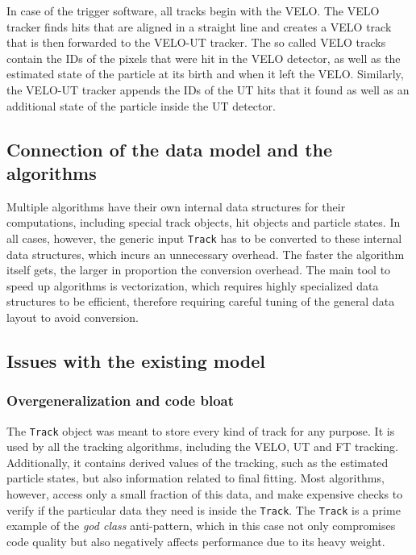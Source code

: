 \documentclass[12pt]{article}
\newcommand{\code}[1]{\texttt{#1}}
\begin{document}
In case of the trigger software, all tracks begin with the VELO. The VELO tracker finds hits that are aligned in a straight line and creates a VELO track that is then forwarded to the VELO-UT tracker. The so called VELO tracks contain the IDs of the pixels that were hit in the VELO detector, as well as the estimated state of the particle at its birth and when it left the VELO. Similarly, the VELO-UT tracker appends the IDs of the UT hits that it found as well as an additional state of the particle inside the UT detector.


\subsection{Connection of the data model and the algorithms}

Multiple algorithms have their own internal data structures for their computations, including special track objects, hit objects and particle states. In all cases, however, the generic input \code{Track} has to be converted to these internal data structures, which incurs an unnecessary overhead. The faster the algorithm itself gets, the larger in proportion the conversion overhead. The main tool to speed up algorithms is vectorization, which requires highly specialized data structures to be efficient, therefore requiring careful tuning of the general data layout to avoid conversion.

\subsection{Issues with the existing model}\label{sec_datamodel_issues}

\subsubsection{Overgeneralization and code bloat}

The \code{Track} object was meant to store every kind of track for any purpose. It is used by all the tracking algorithms, including the VELO, UT and FT tracking. Additionally, it contains derived values of the tracking, such as the estimated particle states, but also information related to final fitting. Most algorithms, however, access only a small fraction of this data, and make expensive checks to verify if the particular data they need is inside the \code{Track}. The \code{Track} is a prime example of the \textit{god class} anti-pattern\cite{god_class_wiki}, which in this case not only compromises code quality but also negatively affects performance due to its heavy weight.
\end{document}
